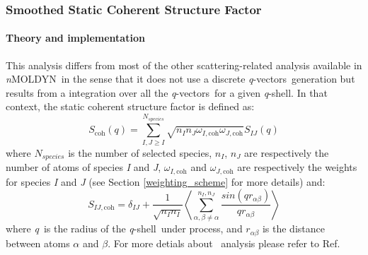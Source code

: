 \documentclass[a4paper,11pt]{report}
\newcommand{\qval}{\textit{q}}
\newcommand{\qvects}{\textit{q}-vectors}
\newcommand{\qshell}{\textit{q}-shell}
\newcommand{\NMOLDYN}{\textit{n}MOLDYN}
\begin{document}
\subsubsection{Smoothed Static Coherent Structure Factor}
\label{sscsf}
\paragraph{Theory and implementation\\}
\label{sscsf_theory}
This analysis differs from most of the other scattering-related analysis available in \NMOLDYN\ in the sense that it does not 
use a discrete \qvects\ generation but results from a integration over all the \qvects\ for a given \qshell. In that 
context, the static coherent structure factor is defined as:
\begin{equation}
S_{\mathrm{coh}}(q) = \sum^{N_{species}}_{I,J \geq I}\sqrt{n_I n_J \omega_{I,\mathrm{coh}}\omega_{J,\mathrm{coh}}} S_{IJ}(q)
\end{equation}
where $N_{species}$ is the number of selected species, $n_I$, $n_J$ are respectively the number of atoms of species \textit{I} and \textit{J}, 
$\omega_{I,\mathrm{coh}}$ and $\omega_{J,\mathrm{coh}}$ are respectively the weights for species \textit{I} and \textit{J} (see Section \ref{weighting_scheme} for more 
details) and:
\begin{equation}
S_{IJ,\mathrm{coh}} = \delta_{IJ} + \frac{1}{\sqrt{n_In_I}}\left\langle\sum_{\alpha, \beta\neq\alpha}^{n_I,n_J} 
\frac{sin(qr_{\alpha\beta})}{qr_{\alpha\beta}}\right\rangle
\end{equation}
where \qval\ is the radius of the \qshell\ under process, and $r_{\alpha\beta}$ is the distance between atoms $\alpha$ and 
$\beta$. For more detials about \SSCSF\ analysis please refer to Ref. \cite{Salmon}
\end{document}
